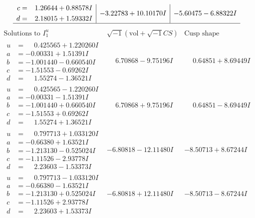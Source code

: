 \documentclass[1p]{elsarticle_modified}
\theoremstyle{definition}
\newcommand{\I}{\sqrt{-1}}
\begin{document}
$$\begin{array}{c|c|c}
\begin{aligned}
c &= \phantom{-}1.26644 + 0.88578 I \\
d &= \phantom{-}2.18015 + 1.59332 I\end{aligned}
 & -3.22783 + 10.10170 I & -5.60475 - 6.88322 I\\
 \hline 
 \end{array}$$\newpage$$\begin{array}{c|c|c}  
\text{Solutions to }I^u_{1}& \I (\text{vol} + \sqrt{-1}CS) & \text{Cusp shape}\\
 \hline 
\begin{aligned}
u &= \phantom{-}0.425565 + 1.220260 I \\
a &= -0.00331 + 1.51391 I \\
b &= -1.001440 - 0.660540 I \\
c &= -1.51553 - 0.69262 I \\
d &= \phantom{-}1.55274 - 1.36521 I\end{aligned}
 & \phantom{-}6.70868 - 9.75196 I & \phantom{-}0.64851 + 8.69449 I \\ \hline\begin{aligned}
u &= \phantom{-}0.425565 - 1.220260 I \\
a &= -0.00331 - 1.51391 I \\
b &= -1.001440 + 0.660540 I \\
c &= -1.51553 + 0.69262 I \\
d &= \phantom{-}1.55274 + 1.36521 I\end{aligned}
 & \phantom{-}6.70868 + 9.75196 I & \phantom{-}0.64851 - 8.69449 I \\ \hline\begin{aligned}
u &= \phantom{-}0.797713 + 1.033120 I \\
a &= -0.66380 + 1.63521 I \\
b &= -1.213130 - 0.525024 I \\
c &= -1.11526 - 2.93778 I \\
d &= \phantom{-}2.23603 - 1.53373 I\end{aligned}
 & -6.80818 - 12.11480 I & -8.50713 + 8.67244 I \\ \hline\begin{aligned}
u &= \phantom{-}0.797713 - 1.033120 I \\
a &= -0.66380 - 1.63521 I \\
b &= -1.213130 + 0.525024 I \\
c &= -1.11526 + 2.93778 I \\
d &= \phantom{-}2.23603 + 1.53373 I\end{aligned}
 & -6.80818 + 12.11480 I & -8.50713 - 8.67244 I \\ \hline\begin{aligned}

\end{aligned}
\end{array}$$
\end{document}
